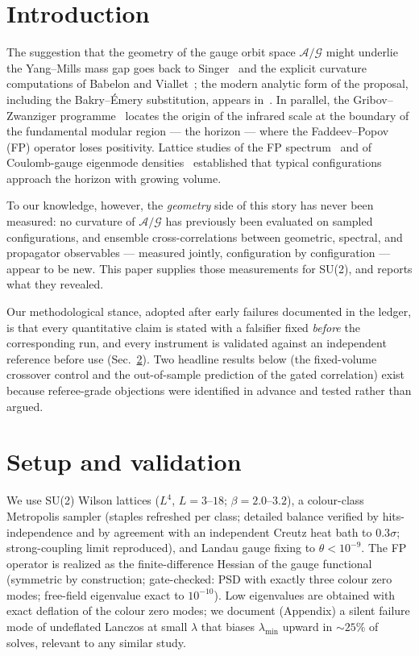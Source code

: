 \documentclass[11pt]{article}
\begin{document}
\section{Introduction}
The suggestion that the geometry of the gauge orbit space
$\mathcal{A}/\mathcal{G}$ might underlie the Yang--Mills mass gap goes back to
Singer~\cite{Singer78,Singer81} and the explicit curvature computations of Babelon and
Viallet~\cite{BabelonViallet}; the modern analytic form of the proposal, including the
Bakry--\'Emery substitution, appears in~\cite{Orland2018}. In parallel, the
Gribov--Zwanziger programme~\cite{Gribov,Zwanziger,VandersickelZwanziger} locates the
origin of the infrared scale at the boundary of the fundamental modular region --- the
horizon --- where the Faddeev--Popov (FP) operator loses positivity. Lattice studies of
the FP spectrum~\cite{Sternbeck05,CucchieriMendes08} and of Coulomb-gauge eigenmode
densities~\cite{GOZ} established that typical configurations approach the horizon with
growing volume.

To our knowledge, however, the \emph{geometry} side of this story has never been measured:
no curvature of $\mathcal{A}/\mathcal{G}$ has previously been evaluated on sampled
configurations, and ensemble cross-correlations between geometric, spectral, and
propagator observables --- measured jointly, configuration by configuration --- appear to
be new. This paper supplies those measurements for SU(2), and reports what they revealed.

Our methodological stance, adopted after early failures documented in the ledger, is that
every quantitative claim is stated with a falsifier fixed \emph{before} the corresponding
run, and every instrument is validated against an independent reference before use
(Sec.~\ref{sec:method}). Two headline results below (the fixed-volume crossover control and
the out-of-sample prediction of the gated correlation) exist because referee-grade objections
were identified in advance and tested rather than argued.

\section{Setup and validation}\label{sec:method}
We use SU(2) Wilson lattices ($L^4$, $L=3$--$18$; $\beta=2.0$--$3.2$), a colour-class
Metropolis sampler (staples refreshed per class; detailed balance verified by
hits-independence and by agreement with an independent Creutz heat bath to $0.3\sigma$;
strong-coupling limit reproduced), and Landau gauge fixing to
$\theta<10^{-9}$. The FP operator is realized as the finite-difference Hessian of the
gauge functional (symmetric by construction; gate-checked: PSD with exactly three
colour zero modes; free-field eigenvalue exact to $10^{-10}$). Low eigenvalues are
obtained with exact deflation of the colour zero modes; we document (Appendix) a silent
failure mode of undeflated Lanczos at small $\lambda$ that biases $\lambda_{\min}$ upward
in $\sim25\%$ of solves, relevant to any similar study.
\end{document}
